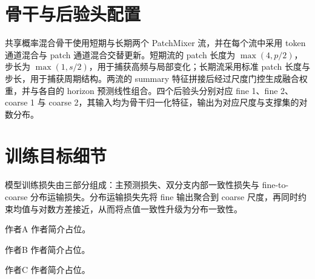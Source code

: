 \documentclass[journal]{IEEEtran}
\begin{document}
\section{骨干与后验头配置}
\label{app:backbone}

共享概率混合骨干使用短期与长期两个 PatchMixer 流，并在每个流中采用 token 通道混合与 patch 通道混合交替更新。短期流的 patch 长度为 $\max(4, p/2)$，步长为 $\max(1, s/2)$，用于捕获高频与局部变化；长期流采用标准 patch 长度与步长，用于捕获周期结构。两流的 summary 特征拼接后经过尺度门控生成融合权重，并与各自的 horizon 预测线性组合。四个后验头分别对应 fine 1、fine 2、coarse 1 与 coarse 2，其输入均为骨干归一化特征，输出为对应尺度与支撑集的对数分布。

\section{训练目标细节}
\label{app:loss}

模型训练损失由三部分组成：主预测损失、双分支内部一致性损失与 fine-to-coarse 分布运输损失。分布运输损失先将 fine 输出聚合到 coarse 尺度，再同时约束均值与对数方差接近，从而将点值一致性升级为分布一致性。

\begin{IEEEbiographynophoto}{作者A}
作者简介占位。
\end{IEEEbiographynophoto}

\begin{IEEEbiographynophoto}{作者B}
作者简介占位。
\end{IEEEbiographynophoto}

\begin{IEEEbiographynophoto}{作者C}
作者简介占位。
\end{IEEEbiographynophoto}
\end{document}
